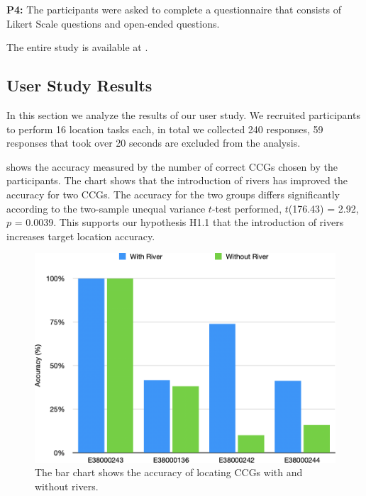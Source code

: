 \textbf{P4:} The participants were asked to complete a questionnaire that consists of Likert Scale questions and open-ended questions.

The entire study is available at .

\subsection{User Study Results}

In this section we analyze the results of our user study. We recruited \pCount participants to perform 16 location tasks each, in total we collected 240 responses, 59 responses that took over 20 seconds are excluded from the analysis.

  shows the accuracy measured by the number of correct CCGs chosen by the participants. The chart shows that the introduction of rivers has improved the accuracy for two CCGs. The accuracy for the two groups differs significantly according to the two-sample unequal variance $t$-test performed, $t$(176.43) = 2.92, $p$ = 0.0039. This supports our hypothesis H1.1 that the introduction of rivers increases target location accuracy.

    {
        \begin{figure}[tb!]
            \centering
            \includegraphics[width=\columnwidth,keepaspectratio]{figure/evaluation/accuracy.png}
            \caption{The bar chart shows the accuracy of locating CCGs with and without rivers.}
            \label{fig:task-acc}
        \end{figure}
    }


